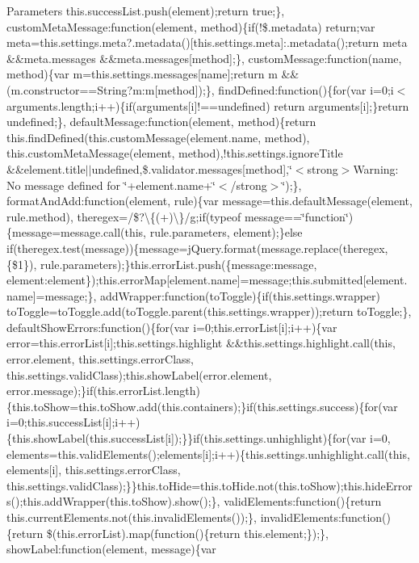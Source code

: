 {\begin{DoxyParams}{Parameters}
this.\+success\+List.\+push(element);return true;\}, custom\+Meta\+Message\+:function(element, method)\{if(!\$.metadata) return;var meta=this.\+settings.\+meta?.metadata()\mbox{[}this.\+settings.\+meta\mbox{]}\+:.metadata();return meta \&\&meta.\+messages \&\&meta.\+messages\mbox{[}method\mbox{]};\}, custom\+Message\+:function(name, method)\{var m=this.\+settings.\+messages\mbox{[}name\mbox{]};return m \&\&(m.\+constructor==String?m\+:m\mbox{[}method\mbox{]});\}, find\+Defined\+:function()\{for(var i=0;i$<$ arguments.\+length;i++)\{if(arguments\mbox{[}i\mbox{]}!==undefined) return arguments\mbox{[}i\mbox{]};\}return undefined;\}, default\+Message\+:function(element, method)\{return this.\+find\+Defined(this.\+custom\+Message(element.\+name, method), this.\+custom\+Meta\+Message(element, method),!this.settings.\+ignore\+Title \&\&element.\+title$\vert$$\vert$undefined,\$.validator.\+messages\mbox{[}method\mbox{]},\char`\"{}$<$strong$>$\+Warning\+: No message defined for \char`\"{}+element.name+\char`\"{}$<$/strong$>$\char`\"{});\}, format\+And\+Add\+:function(element, rule)\{var message=this.\+default\+Message(element, rule.\+method), theregex=/\$?\textbackslash{}\{(+)\textbackslash{}\}/g;if(typeof message==\char`\"{}function\char`\"{})\{message=message.\+call(this, rule.\+parameters, element);\}else if(theregex.\+test(message))\{message=j\+Query.\+format(message.\+replace(theregex, \textquotesingle{}\{\$1\}\textquotesingle{}), rule.\+parameters);\}this.\+error\+List.\+push(\{message\+:message, element\+:element\});this.\+error\+Map\mbox{[}element.\+name\mbox{]}=message;this.\+submitted\mbox{[}element.\+name\mbox{]}=message;\}, add\+Wrapper\+:function(to\+Toggle)\{if(this.\+settings.\+wrapper) to\+Toggle=to\+Toggle.\+add(to\+Toggle.\+parent(this.\+settings.\+wrapper));return to\+Toggle;\}, default\+Show\+Errors\+:function()\{for(var i=0;this.\+error\+List\mbox{[}i\mbox{]};i++)\{var error=this.\+error\+List\mbox{[}i\mbox{]};this.\+settings.\+highlight \&\&this.\+settings.\+highlight.\+call(this, error.\+element, this.\+settings.\+error\+Class, this.\+settings.\+valid\+Class);this.\+show\+Label(error.\+element, error.\+message);\}if(this.\+error\+List.\+length)\{this.\+to\+Show=this.\+to\+Show.\+add(this.\+containers);\}if(this.\+settings.\+success)\{for(var i=0;this.\+success\+List\mbox{[}i\mbox{]};i++)\{this.\+show\+Label(this.\+success\+List\mbox{[}i\mbox{]});\}\}if(this.\+settings.\+unhighlight)\{for(var i=0, elements=this.\+valid\+Elements();elements\mbox{[}i\mbox{]};i++)\{this.\+settings.\+unhighlight.\+call(this, elements\mbox{[}i\mbox{]}, this.\+settings.\+error\+Class, this.\+settings.\+valid\+Class);\}\}this.\+to\+Hide=this.\+to\+Hide.\+not(this.\+to\+Show);this.\+hide\+Errors();this.\+add\+Wrapper(this.\+to\+Show).show();\}, valid\+Elements\+:function()\{return this.\+current\+Elements.\+not(this.\+invalid\+Elements());\}, invalid\+Elements\+:function()\{return \$(this.\+error\+List).map(function()\{return this.\+element;\});\}, show\+Label\+:function(element, message)\{var 
\end{DoxyParams}}
